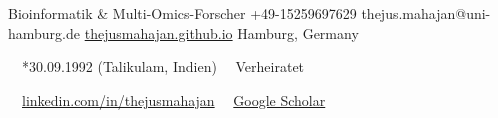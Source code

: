 \documentclass{thejus_cv}
\begin{document}
         {Bioinformatik \& Multi-Omics-Forscher}
         {+49-15259697629}
         {thejus.mahajan@uni-hamburg.de}
         {\href{https://thejusmahajan.github.io}{thejusmahajan.github.io}}
         {Hamburg, Germany}

\vspace{-0.5cm}
{\small\color{white}
\faCalendar\ \ *30.09.1992 (Talikulam, Indien) \hspace{0.5cm} \faUser\ \ Verheiratet
}\par
\vspace{0.1cm}
{\small\color{white}
\faLinkedin\ \ \href{https://www.linkedin.com/in/thejusmahajan/}{linkedin.com/in/thejusmahajan}
\hspace{0.5cm}
\faGraduationCap\ \ \href{https://scholar.google.com/citations?user=PJkZwAwAAAAJ}{Google Scholar}
}\par
\vspace{0.1cm}
\end{document}

